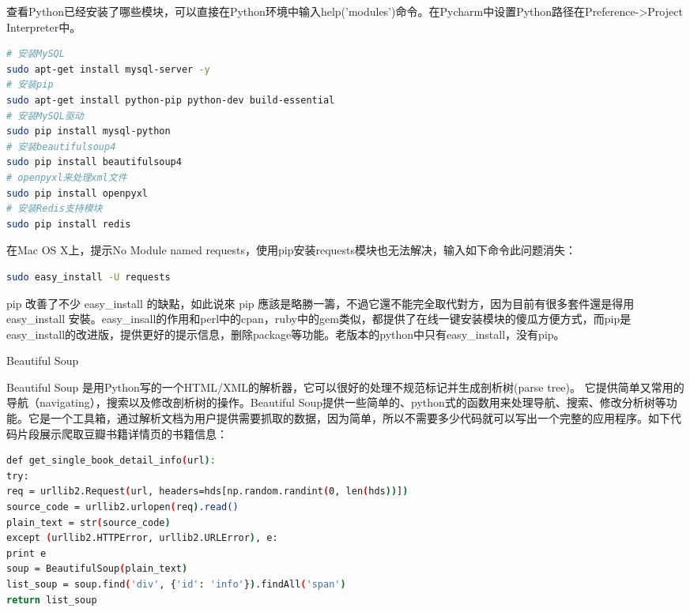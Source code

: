 \documentclass[12pt]{book}
\makeatletter
\numberwithin{dummy}{section}
\theoremstyle{ocrenumbox}
\theoremstyle{blacknumex}
\theoremstyle{blacknumbox}
\theoremstyle{ocrenum}
\renewcommand{\subsection}{\@startsection {subsection}{2}{\z@}
	{-3ex \@plus -0.1ex \@minus -.4ex}
	{0.5ex \@plus.2ex }
	{\normalfont\sffamily\bfseries}}
\makeatother
\begin{document}
查看Python已经安装了哪些模块，可以直接在Python环境中输入help('modules')命令。在Pycharm中设置Python路径在Preference->Project Interpreter中。

\begin{lstlisting}[language=Bash]
# 安装MySQL
sudo apt-get install mysql-server -y
# 安装pip
sudo apt-get install python-pip python-dev build-essential
# 安装MySQL驱动
sudo pip install mysql-python
# 安装beautifulsoup4
sudo pip install beautifulsoup4
# openpyxl来处理xml文件
sudo pip install openpyxl
# 安装Redis支持模块
sudo pip install redis
\end{lstlisting}

在Mac OS X上，提示No Module named requests，使用pip安装requests模块也无法解决，输入如下命令此问题消失：

\begin{lstlisting}[language=Bash]
sudo easy_install -U requests
\end{lstlisting}

pip 改善了不少 easy\_install 的缺點，如此说來 pip 應該是略勝一籌，不過它還不能完全取代對方，因为目前有很多套件還是得用 easy\_install 安裝。easy\_insall的作用和perl中的cpan，ruby中的gem类似，都提供了在线一键安装模块的傻瓜方便方式，而pip是easy\_install的改进版，提供更好的提示信息，删除package等功能。老版本的python中只有easy\_install，没有pip。

\subsection{Beautiful Soup}

Beautiful Soup 是用Python写的一个HTML/XML的解析器，它可以很好的处理不规范标记并生成剖析树(parse tree)。 它提供简单又常用的导航（navigating），搜索以及修改剖析树的操作。Beautiful Soup提供一些简单的、python式的函数用来处理导航、搜索、修改分析树等功能。它是一个工具箱，通过解析文档为用户提供需要抓取的数据，因为简单，所以不需要多少代码就可以写出一个完整的应用程序。如下代码片段展示爬取豆瓣书籍详情页的书籍信息：

\begin{lstlisting}[language=Bash]
def get_single_book_detail_info(url):
try:
req = urllib2.Request(url, headers=hds[np.random.randint(0, len(hds))])
source_code = urllib2.urlopen(req).read()
plain_text = str(source_code)
except (urllib2.HTTPError, urllib2.URLError), e:
print e
soup = BeautifulSoup(plain_text)
list_soup = soup.find('div', {'id': 'info'}).findAll('span')
return list_soup
\end{lstlisting}
\end{document}
